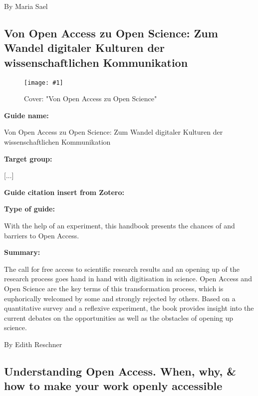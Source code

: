 \documentclass{article}
\newlength{\imgwidth}
\newcommand\scaledgraphics[2]{%
                
\settowidth{\imgwidth}{\texttt{[image: \#1]}}%
                
\setlength{\imgwidth}{\minof{\imgwidth}{#2\textwidth}}%
                
\texttt{[image: \#1]}%
                
}
\begin{document}
By Maria Sael 





\subsection{Von Open Access zu Open Science: Zum Wandel digitaler Kulturen der wissenschaftlichen Kommunikation}\label{H9740541}



\begin{center}
\begin{figure}
\scaledgraphics{499c4719-8346-4a67-8a5b-fcacfb0ecde0.png}{0.5}
\caption*{Cover: "Von Open Access zu Open Science"}\label{F14991031}
\end{figure}


\end{center}




\textbf{Guide name:} 

Von Open Access zu Open Science: Zum Wandel digitaler Kulturen der wissenschaftlichen Kommunikation


\textbf{Target group:}

[...]


\textbf{Guide citation insert from Zotero:}

\autocite{heise_von_2018}


\textbf{Type of guide:}

With the help of an experiment, this handbook presents the chances of and barriers to Open Access.


\textbf{Summary:}

The call for free access to scientific research results and an opening up of the research process goes hand in hand with digitisation in science. Open Access and Open Science are the key terms of this transformation process, which is euphorically welcomed by some and strongly rejected by others. Based on a quantitative survey and a reflexive experiment, the book provides insight into the current debates on the opportunities as well as the obstacles of opening up science.


By Edith Reschner 





\subsection{Understanding Open Access. When, why, \& how to make your work openly accessible}\label{H1144211}
\end{document}

